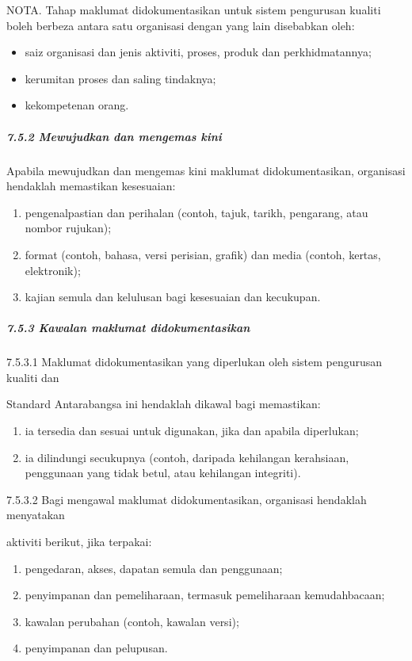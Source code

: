 \documentclass[
]{article}
\providecommand{\tightlist}{%
  \setlength{\itemsep}{0pt}\setlength{\parskip}{0pt}}
\begin{document}
NOTA. Tahap maklumat didokumentasikan untuk sistem pengurusan kualiti
boleh berbeza antara satu organisasi dengan yang lain disebabkan oleh:

\begin{itemize}
\tightlist
\item
  saiz organisasi dan jenis aktiviti, proses, produk dan
  perkhidmatannya;
\item
  kerumitan proses dan saling tindaknya;
\item
  kekompetenan orang.
\end{itemize}

\hypertarget{mewujudkan-dan-mengemas-kini}{%
\subparagraph{7.5.2 Mewujudkan dan mengemas
kini}\label{mewujudkan-dan-mengemas-kini}}

Apabila mewujudkan dan mengemas kini maklumat didokumentasikan,
organisasi hendaklah memastikan kesesuaian:

\begin{enumerate}
\def\labelenumi{\alph{enumi})}
\item
  pengenalpastian dan perihalan (contoh, tajuk, tarikh, pengarang, atau
  nombor rujukan);
\item
  format (contoh, bahasa, versi perisian, grafik) dan media (contoh,
  kertas, elektronik);
\item
  kajian semula dan kelulusan bagi kesesuaian dan kecukupan.
\end{enumerate}

\hypertarget{kawalan-maklumat-didokumentasikan}{%
\subparagraph{7.5.3 Kawalan maklumat
didokumentasikan}\label{kawalan-maklumat-didokumentasikan}}

7.5.3.1 Maklumat didokumentasikan yang diperlukan oleh sistem pengurusan
kualiti dan

Standard Antarabangsa ini hendaklah dikawal bagi memastikan:

\begin{enumerate}
\def\labelenumi{\alph{enumi})}
\item
  ia tersedia dan sesuai untuk digunakan, jika dan apabila diperlukan;
\item
  ia dilindungi secukupnya (contoh, daripada kehilangan kerahsiaan,
  penggunaan yang tidak betul, atau kehilangan integriti).
\end{enumerate}

7.5.3.2 Bagi mengawal maklumat didokumentasikan, organisasi hendaklah
menyatakan

aktiviti berikut, jika terpakai:

\begin{enumerate}
\def\labelenumi{\alph{enumi})}
\item
  pengedaran, akses, dapatan semula dan penggunaan;
\item
  penyimpanan dan pemeliharaan, termasuk pemeliharaan kemudahbacaan;
\item
  kawalan perubahan (contoh, kawalan versi);
\item
  penyimpanan dan pelupusan.
\end{enumerate}
\end{document}
